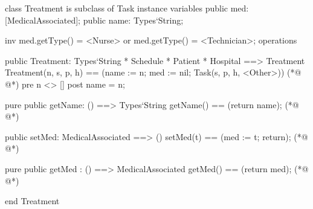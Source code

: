 \begin{vdmpp}[breaklines=true]
class Treatment is subclass of Task
instance variables
  public med: [MedicalAssociated];
  public name: Types`String;
  
  inv med.getType() = <Nurse> or med.getType() = <Technician>;
operations

 public Treatment: Types`String * Schedule * Patient * Hospital ==> Treatment
  Treatment(n, s, p, h) == (name := n; med := nil; Task(s, p, h, <Other>))
(*@
\label{Treatment:11}
@*)
 pre n <> []
 post name = n;
 
 pure public getName: () ==> Types`String
  getName() == (return name);
(*@
\label{getName:16}
@*)
  
 public setMed: MedicalAssociated ==> ()
  setMed(t) == (med := t; return);
(*@
\label{setMed:19}
@*)
 
 pure public getMed : () ==> MedicalAssociated
  getMed() == (return med);
(*@
\label{getMed:22}
@*)

end Treatment
\end{vdmpp}
